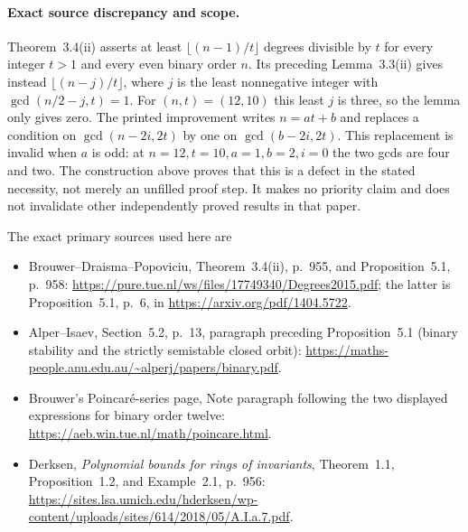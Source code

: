 \paragraph{Exact source discrepancy and scope.}
Theorem~3.4(ii) asserts at least $\lfloor(n-1)/t\rfloor$
degrees divisible by $t$ for every integer $t>1$ and every
even binary order $n$. Its preceding Lemma~3.3(ii) gives
instead $\lfloor(n-j)/t\rfloor$, where $j$ is the least
nonnegative integer with $\gcd(n/2-j,t)=1$.
For $(n,t)=(12,10)$ this least $j$ is three, so the lemma
only gives zero. The printed improvement writes $n=at+b$
and replaces a condition on $\gcd(n-2i,2t)$ by one on
$\gcd(b-2i,2t)$. This replacement is invalid when $a$ is
odd: at $n=12,t=10,a=1,b=2,i=0$ the two gcds are four
and two. The construction above proves that this is a
defect in the stated necessity, not merely an unfilled
proof step. It makes no priority claim and does not
invalidate other independently proved results in that paper.

The exact primary sources used here are
\begin{itemize}
\item Brouwer--Draisma--Popoviciu, Theorem~3.4(ii), p.~955,
and Proposition~5.1, p.~958:
\url{https://pure.tue.nl/ws/files/17749340/Degrees2015.pdf};
the latter is Proposition~5.1, p.~6, in
\url{https://arxiv.org/pdf/1404.5722}.
\item Alper--Isaev, Section~5.2, p.~13, paragraph preceding
Proposition~5.1 (binary stability and the strictly semistable
closed orbit):
\url{https://maths-people.anu.edu.au/~alperj/papers/binary.pdf}.
\item Brouwer's Poincar\'e-series page, Note paragraph
following the two displayed expressions for binary order
twelve:
\url{https://aeb.win.tue.nl/math/poincare.html}.
\item Derksen, \emph{Polynomial bounds for rings of
invariants}, Theorem~1.1, Proposition~1.2, and Example~2.1,
p.~956:
\url{https://sites.lsa.umich.edu/hderksen/wp-content/uploads/sites/614/2018/05/A.I.a.7.pdf}.
\end{itemize}
